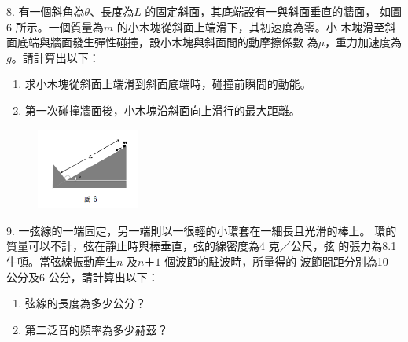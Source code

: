 \documentclass[cn,10pt,math=newtx]{elegantbook}
\begin{document}
\begin{example}
   8. 有一個斜角為$\theta$、長度為$L$ 的固定斜面，其底端設有一與斜面垂直的牆面，
如圖6 所示。一個質量為$m$ 的小木塊從斜面上端滑下，其初速度為零。小
木塊滑至斜面底端與牆面發生彈性碰撞，設小木塊與斜面間的動摩擦係數
為$\mu$，重力加速度為$g$。請計算出以下：
\begin{enumerate}[label=(\arabic*)] 
  \item 求小木塊從斜面上端滑到斜面底端時，碰撞前瞬間的動能。
  \item 第一次碰撞牆面後，小木塊沿斜面向上滑行的最大距離。
    \end{enumerate}
    
    \rightline{[高雄聯招教甄109]}
\end{example}
\begin{solution}
    
\end{solution}
\begin{figure}[htbp]
    \flushright
    \includegraphics[width=0.3\textwidth]{image/109高雄8.png}
  \end{figure}
\newpage



\begin{example}
   9. 一弦線的一端固定，另一端則以一很輕的小環套在一細長且光滑的棒上。
環的質量可以不計，弦在靜止時與棒垂直，弦的線密度為4 $克／公尺$，弦
的張力為8.1 牛頓。當弦線振動產生$n$ 及$n＋1$ 個波節的駐波時，所量得的
波節間距分別為10 公分及6 公分，請計算出以下：
\begin{enumerate}[label=(\arabic*)] 
  \item 弦線的長度為多少公分？
  \item 第二泛音的頻率為多少赫茲？
    \end{enumerate}
    
    \rightline{[高雄聯招教甄109]}
\end{example}
\begin{solution}
    
\end{solution}

\newpage
\end{document}
